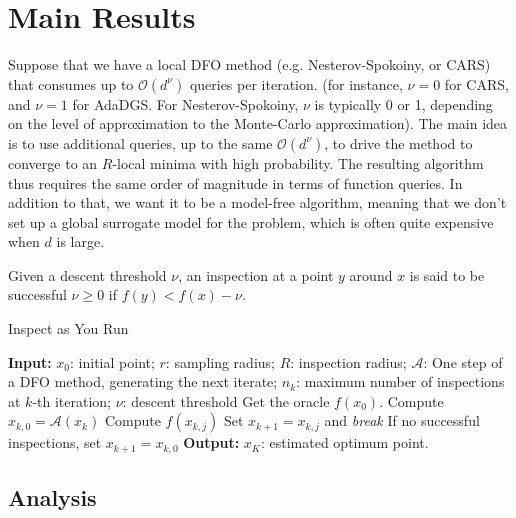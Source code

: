 
\section{Main Results}
Suppose that we have a local DFO method (e.g. Nesterov-Spokoiny\cite{nesterov2017random}, or CARS\cite{kim2021curvature}) that consumes up to $\mathcal{O}(d^\nu)$ queries per iteration. (for instance, $\nu = 0$ for CARS, and $\nu=1$ for AdaDGS. For Nesterov-Spokoiny, $\nu$ is typically 0 or 1, depending on the level of approximation to the Monte-Carlo approximation).
The main idea is to use additional queries, up to the same $\mathcal{O}(d^\nu)$, to drive the method to converge to an $R$-local minima with high probability. The resulting algorithm thus requires the same order of magnitude in terms of function queries.
In addition to that, we want it to be a model-free algorithm, meaning that we don't set up a global surrogate model for the problem, which is often quite expensive when $d$ is large.



\begin{definition} Given a descent threshold $\nu$, an inspection at a point $y$ around $x$ is said to be successful $\nu \geq 0$ if $f(y) < f(x) - \nu$.
\end{definition}


\begin{algorithm}[H]
\caption{Inspect as You Run}
 \label{alg:IR general}
\begin{algorithmic}[1]
  \State \textbf{Input:} $x_0$: initial point; $r$: sampling radius; $R$: inspection radius; $\mathcal{A}$: One step of a DFO method, generating the next iterate; $n_k$: maximum number of inspections at $k$-th iteration; $\nu$: descent threshold
  \State Get the oracle $f(x_0)$.
        \State Compute $x_{k, 0} = \mathcal{A}(x_k)$
            \State Compute $f(x_{k,j})$ 
                \State Set $x_{k+1} = x_{k,j}$ and \emph{break}
            \EndIf
        \EndFor
        \State If no successful inspections, set $x_{k+1} = x_{k,0}$ \label{eq: inspection step in the algorithm 1}
  \EndFor
   \State \textbf{Output:} $x_K$: estimated optimum point.
\end{algorithmic}
\end{algorithm}

\subsection{Analysis}

